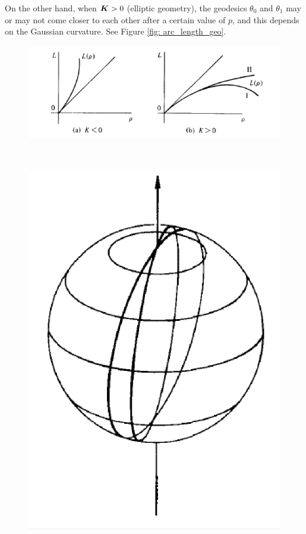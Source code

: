 \documentclass[11pt]{article}
\begin{document}
\begin{itemize}
On the other hand, when $\boldsymbol{K}>0$ (elliptic geometry), the geodesics $\theta_{0}$ and $\theta_{1}$ may or may not come closer to each other after a certain value of $p$, and this depends on the Gaussian curvature. See Figure \ref{fig: arc_length_geo}.
\begin{figure}[tbh]
\centering
\begin{minipage}{0.6\linewidth}
 \centerline{\includegraphics[scale = 0.43]{arc_length_geodesic.png}}
\end{minipage}\\
\begin{minipage}{0.6\linewidth}
 \centerline{\includegraphics[scale = 0.43]{arc_length_geodesic2.png}}

\end{minipage}
\end{figure}
\end{itemize}
\end{document}
